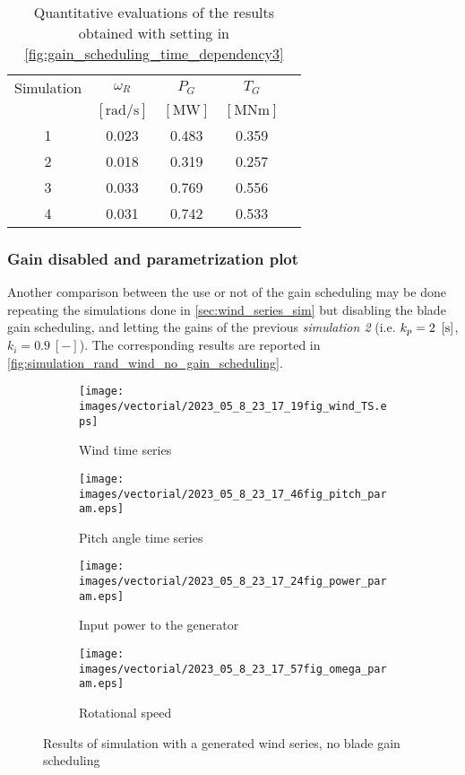 \begin{table}[htb]
  \caption{Quantitative evaluations of the results obtained with setting in \autoref{fig:gain_scheduling_time_dependency3}}
  \centering
  \begin{tabular}{ccccc}
  \toprule
    Simulation & $\omega_R$  & $P_G$ & $T_G$ \\ 
     & $\left[\si{\radian\per\second}\right]$ & $\left[\si{\mega\watt}\right]$ &$\left[\si{\mega\newton\meter}\right]$ \\ \midrule       
     1 & 0.023 & 0.483 & 0.359 \\
     2 & 0.018 & 0.319 & 0.257 \\
     3 & 0.033 & 0.769 & 0.556 \\
     4 & 0.031 & 0.742 & 0.533 \\
     \bottomrule
  \end{tabular}
  \label{tab:res_variable_gains3}
\end{table}

\subsubsection{Gain disabled and parametrization plot}

Another comparison between the use or not of the gain scheduling may be done repeating the simulations done in \autoref{sec:wind_series_sim} but disabling the blade gain scheduling, and letting the gains of the previous \textit{simulation 2} (i.e. $k_p = 2 \ \left[\si{\second}\right]$, $k_i=0.9 \ [-]$). The corresponding results are reported in \autoref{fig:simulation_rand_wind_no_gain_scheduling}.
\begin{figure}[htb]
  \begin{subfigure}{0.5\columnwidth}
    \centering
    \texttt{[image: images/vectorial/2023\_05\_8\_23\_17\_19fig\_wind\_TS.eps]}
    \caption{Wind time series}
    \label{fig:2023_05_8_22_43_35fig_wind_TS.eps}
  \end{subfigure}
  \begin{subfigure}{0.5\columnwidth}
    \centering
    \texttt{[image: images/vectorial/2023\_05\_8\_23\_17\_46fig\_pitch\_param.eps]}
    \caption{Pitch angle time series}
    \label{fig:2023_05_8_22_44_05fig_pitch_param}
  \end{subfigure}
  \begin{subfigure}{0.5\columnwidth}
    \centering
    \texttt{[image: images/vectorial/2023\_05\_8\_23\_17\_24fig\_power\_param.eps]}
    \caption{Input power to the generator}
    \label{fig:2023_05_8_22_44_15fig_power_param}
  \end{subfigure}
  \begin{subfigure}{0.5\columnwidth}
    \centering
    \texttt{[image: images/vectorial/2023\_05\_8\_23\_17\_57fig\_omega\_param.eps]}
    \caption{Rotational speed}
    \label{fig:2023_05_8_23_17_57fig_omega_param}
  \end{subfigure}
  \caption{Results of simulation with a generated wind series, no blade gain scheduling}
  \label{fig:simulation_rand_wind_no_gain_scheduling}
\end{figure}

